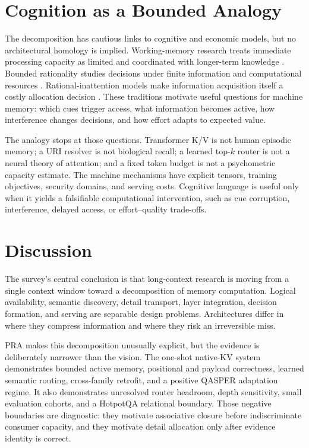 \documentclass[10pt,a4paper]{article}
\begin{document}
\section{Cognition as a Bounded Analogy}

The decomposition has cautious links to cognitive and economic models, but no architectural
homology is implied. Working-memory research treats immediate processing capacity as limited
and coordinated with longer-term knowledge \citep{baddeley1992working}. Bounded rationality
studies decisions under finite information and computational resources
\citep{simon1955behavioral}. Rational-inattention models make information acquisition itself a
costly allocation decision \citep{sims2003implications}. These traditions motivate useful
questions for machine memory: which cues trigger access, what information becomes active,
how interference changes decisions, and how effort adapts to expected value.

The analogy stops at those questions. Transformer K/V is not human episodic memory; a URI
resolver is not biological recall; a learned top-$k$ router is not a neural theory of attention;
and a fixed token budget is not a psychometric capacity estimate. The machine mechanisms have
explicit tensors, training objectives, security domains, and serving costs. Cognitive language
is useful only when it yields a falsifiable computational intervention, such as cue corruption,
interference, delayed access, or effort--quality trade-offs.

\section{Discussion}

The survey's central conclusion is that long-context research is moving from a single context
window toward a decomposition of memory computation. Logical availability, semantic discovery,
detail transport, layer integration, decision formation, and serving are separable design
problems. Architectures differ in where they compress information and where they risk an
irreversible miss.

PRA makes this decomposition unusually explicit, but the evidence is deliberately narrower
than the vision. The one-shot native-KV system demonstrates bounded active memory, positional
and payload correctness, learned semantic routing, cross-family retrofit, and a positive
QASPER adaptation regime. It also demonstrates unresolved router headroom, depth sensitivity,
small evaluation cohorts, and a HotpotQA relational boundary. Those negative boundaries are
diagnostic: they motivate associative closure before indiscriminate consumer capacity, and
they motivate detail allocation only after evidence identity is correct.
\end{document}
